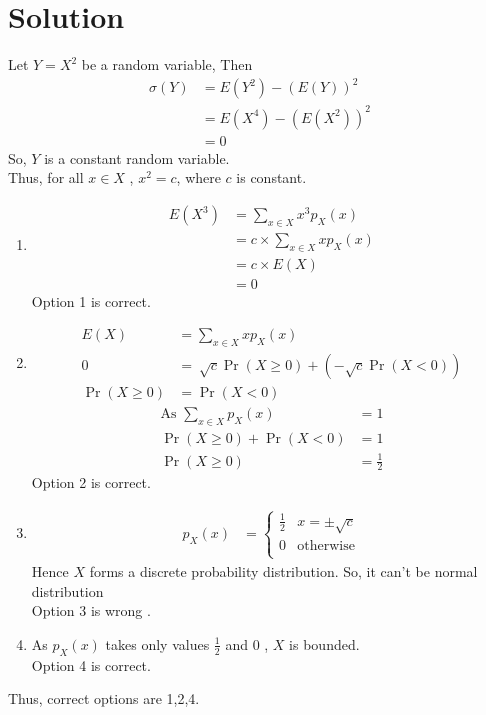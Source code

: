 \documentclass[journal,12pt,twocolumn]{IEEEtran}
\begin{document}
\section{Solution}
Let $Y=X^2$ be a random variable, Then 
\begin{align*}
    \sigma(Y) &= E(Y^2) - (E(Y))^{2} \\
    &= E(X^4) - (E(X^2))^2 \\
             &= 0
             \end{align*}
So, $Y$ is a constant random variable.\\
Thus, for all $x \in X$  , $x^2 = c $, where $c$ is constant.
\begin{enumerate}
    \item 
    \begin{align*}
        E(X^3) &= \sum_{x \in X} x^3 p_X(x) \\
        &= c \times \sum_{x \in X} x p_X(x)\\
        &= c \times E(X)\\
        &= 0
    \end{align*}
    Option 1 is correct.
    \item
    \begin{align*}
     E(X)  &= \sum_{x \in X} x p_X(x)  \\
       0 &=  \ \sqrt{c} \Pr(X \geq 0) + \left(-\sqrt{c} \Pr(X < 0 ) \right) \\
      \Pr(X \geq 0) &= \Pr(X < 0)
    \end{align*}
    \begin{align*}
        \text{As } \sum_{x \in X}  p_X(x) &= 1\\
      \Pr(X \geq 0) + \Pr(X < 0)  &= 1\\
      \Pr(X \geq 0) &= \frac{1}{2}
    \end{align*}
    Option 2 is correct.
    
    \item 
    \begin{align*}
    p_X(x) &= \begin{cases} 
      \frac{1}{2} & x = \pm \sqrt{c} \\
      0 & \text{otherwise} \\
   \end{cases} 
\end{align*} 
Hence $X$ forms a discrete probability distribution. So, it can't be normal distribution\\
Option 3 is wrong .\\

\item 
As $p_X(x)$ takes only values $\frac{1}{2}$ and 0 , $X$ is bounded.\\
Option 4 is correct.
\end{enumerate}
Thus, correct options are 1,2,4.
\end{document}
